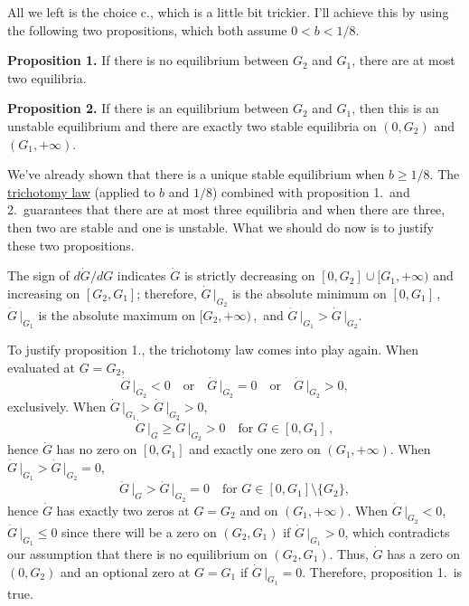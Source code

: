     All we left is the choice c., which is a little bit trickier. I'll achieve
    this by using the following two propositions, which both assume $ 0 < b <
    1/8 $.
    
    {\raggedright
        \textbf{Proposition 1.} If there is no equilibrium between $ G_2 $ and $
        G_1 $, there are at most two equilibria.
            
        \textbf{Proposition 2.} If there is an equilibrium between $ G_2 $ and $
        G_1 $, then this is an unstable equilibrium and there are exactly two
        stable equilibria on $ (0,G_2) $ and $ (G_1,+\infty) $. }
    
    We've already shown that there is a unique stable equilibrium when $ b \ge
    1/8 $. The
    \href{http://mathworld.wolfram.com/TrichotomyLaw.html}{trichotomy law}
    (applied to $ b $ and $ 1/8 $) combined with proposition 1.\ and 2.\
    guarantees that there are at most three equilibria and when there are
    three, then two are stable and one is unstable. What we should do now is to
    justify these two propositions.
    
    The sign of $ d\dot{G}/dG $ indicates $ \dot{G} $ is strictly decreasing on
    $ [0,G_2] \cup [G_1,+\infty) $ and increasing on $ [G_2,G_1] $; therefore, $
    \dot{G}\,\vert_{G_2} $ is the absolute minimum on $ [0,G_1] $\,,\, $
    \dot{G}\,\vert_{G_1} $ is the absolute maximum on $ [G_2,+\infty) $\,,\, and
    $ \dot{G}\,\vert_{G_1} > \dot{G}\,\vert_{G_2} $.
    
    To justify proposition 1., the trichotomy law comes into play again. When
    evaluated at $ G=G_2 $,
         \[ \dot{G}\,\vert_{G_2} < 0 \quad \text{or} \quad \dot{G}\,\vert_{G_2}
         = 0 \quad \text{or} \quad \dot{G}\,\vert_{G_2} > 0, \]
    exclusively. When $ \dot{G}\,\vert_{G_1} > \dot{G}\,\vert_{G_2} > 0 $,
        \[ \dot{G}\,\vert_{G} \ge \dot{G}\,\vert_{G_2} > 0 \quad \text{for } G
        \in [0,G_1]\,, \]
     hence $ \dot{G} $ has no zero on $ [0,G_1] $ and exactly one zero on $
     (G_1,+\infty) $. When $ \dot{G}\,\vert_{G_1} > \dot{G}\,\vert_{G_2} = 0 $,
         \[ \dot{G}\,\vert_{G} > \dot{G}\,\vert_{G_2} = 0  \quad \text{for } G
         \in [0,G_1]\setminus\{G_2\}, \]
     hence $ \dot{G} $ has exactly two zeros at $ G=G_2 $ and on $ (G_1,+\infty)
     $. When $ \dot{G}\,\vert_{G_2} < 0 $, $ \dot{G}\,\vert_{G_1} \le 0 $ since there will be a zero on $ (G_2,G_1) $  if $ \dot{G}\,\vert_{G_1} > 0 $, which contradicts our assumption that there is no equilibrium on $ (G_2,G_1) $. Thus, $ \dot{G} $ has a zero on $ (0,G_2) $ and an optional zero at $ G=G_1 $ if $ \dot{G}\,\vert_{G_1} = 0 $. Therefore, proposition 1.\ is true.
     

